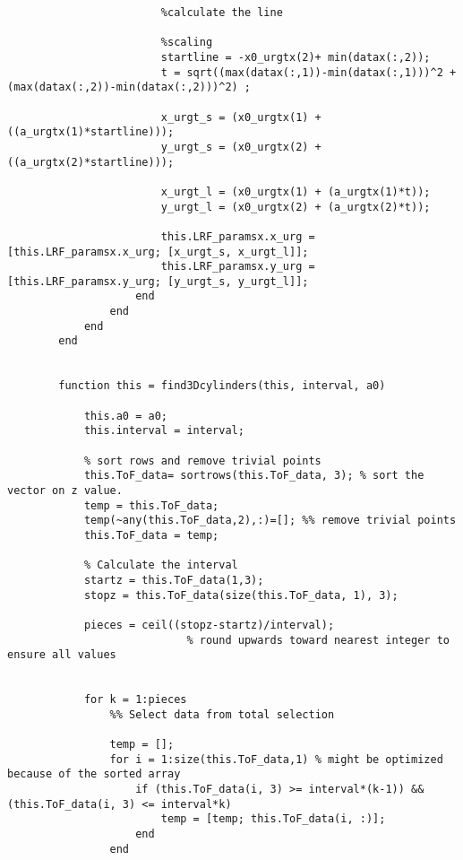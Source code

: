 \begin{lstlisting}
                        %calculate the line
                        
                        %scaling
                        startline = -x0_urgtx(2)+ min(datax(:,2));
                        t = sqrt((max(datax(:,1))-min(datax(:,1)))^2 + (max(datax(:,2))-min(datax(:,2)))^2) ;
                        
                        x_urgt_s = (x0_urgtx(1) + ((a_urgtx(1)*startline)));
                        y_urgt_s = (x0_urgtx(2) + ((a_urgtx(2)*startline)));
                        
                        x_urgt_l = (x0_urgtx(1) + (a_urgtx(1)*t));
                        y_urgt_l = (x0_urgtx(2) + (a_urgtx(2)*t));
                        
                        this.LRF_paramsx.x_urg = [this.LRF_paramsx.x_urg; [x_urgt_s, x_urgt_l]];
                        this.LRF_paramsx.y_urg = [this.LRF_paramsx.y_urg; [y_urgt_s, y_urgt_l]];
                    end
                end
            end
        end
        
        
        function this = find3Dcylinders(this, interval, a0)
 
            this.a0 = a0;
            this.interval = interval;
            
            % sort rows and remove trivial points
            this.ToF_data= sortrows(this.ToF_data, 3); % sort the vector on z value.
            temp = this.ToF_data;
            temp(~any(this.ToF_data,2),:)=[]; %% remove trivial points
            this.ToF_data = temp;
            
            % Calculate the interval
            startz = this.ToF_data(1,3);
            stopz = this.ToF_data(size(this.ToF_data, 1), 3);
            
            pieces = ceil((stopz-startz)/interval); 
                            % round upwards toward nearest integer to ensure all values
            
            
            for k = 1:pieces
                %% Select data from total selection
                
                temp = [];
                for i = 1:size(this.ToF_data,1) % might be optimized because of the sorted array
                    if (this.ToF_data(i, 3) >= interval*(k-1)) && (this.ToF_data(i, 3) <= interval*k)
                        temp = [temp; this.ToF_data(i, :)];
                    end
                end
                
                
                

\end{lstlisting}
